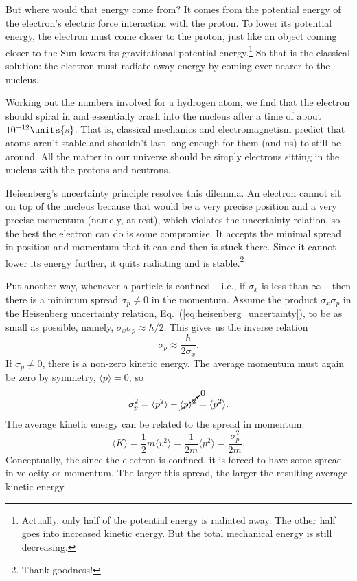 But where would that energy come from?  It comes from the potential energy
of the electron's electric force interaction with the proton.  To lower
its potential energy, the electron must come closer to the proton,
just like an object coming closer to the Sun lowers its gravitational
potential energy.\footnote{Actually, only half of the potential energy
is radiated away.  The other half goes into increased kinetic energy.
But the total mechanical energy is still decreasing.} So that is the
classical solution: the electron must radiate away energy by coming ever
nearer to the nucleus.

Working out the numbers involved for a hydrogen atom, we
find that the electron should spiral in and essentially crash into the
nucleus after a time of about $10^{-12}\units{s}$.  That is,
classical mechanics and electromagnetism predict that atoms
aren't stable and shouldn't last long enough for them (and us) to
still be around.  All the matter in our universe should be simply
electrons sitting in the nucleus with the protons and neutrons.

Heisenberg's uncertainty principle resolves this dilemma.  An electron
cannot sit on top of the nucleus because that would be a very precise
position and a very precise momentum (namely, at rest), which violates
the uncertainty relation, so the best the electron can do is some
compromise.  It accepts the minimal spread in position and momentum
that it can and then is stuck there.  Since it cannot lower its
energy further, it quits radiating and is stable.\footnote{Thank
  goodness!}

Put another way, whenever a particle is confined -- i.e., if $\sigma_x$
is less than $\infty$ -- then there is a minimum spread $\sigma_p
\ne 0$ in the momentum.  Assume the product $\sigma_x\sigma_p$ in the
Heisenberg uncertainty relation, Eq.~(\ref{eq:heisenberg_uncertainty}),
to be as small as possible, namely, $\sigma_x\sigma_p\approx \hbar/2$.
This gives us the inverse relation
\begin{equation}
 \sigma_p \approx\frac{\hbar}{2\sigma_x}.
 \label{eq:sigmap_from_sigmax}
\end{equation}
If $\sigma_p \ne 0$, there is a non-zero kinetic energy.  The average 
momentum must again be zero by symmetry, $\langle p\rangle=0$, so 
\begin{equation}
\sigma_p^2 = \langle p^2\rangle - \cancelto{0}{\langle p\rangle^2}
 = \langle p^2\rangle.
\end{equation}
The average kinetic energy can be related to the spread in momentum:
\begin{equation}
  \langle K\rangle = \frac{1}{2}m\langle v^2\rangle =
  \frac{1}{2m}\langle p^2\rangle = \frac{\sigma_p^2}{2m} .
  \label{eq:ke_from_spread}
\end{equation}
Conceptually, the since the electron is confined, it 
is forced to have some spread in velocity or momentum.  The
larger this spread, the larger the resulting average kinetic energy.

